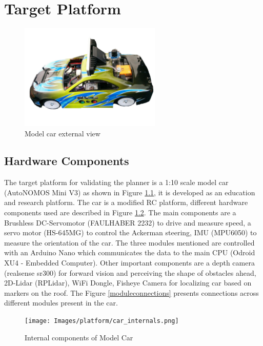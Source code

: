 \chapter{Target Platform}
\label{vehicle_info}

\begin{figure}[H]
	\centering
	\includegraphics[width=0.6\textwidth]{Images/platform/car.jpg}
	\caption{Model car external view}
	\label{model_car}
\end{figure}

\section{Hardware Components}
The target platform for validating the planner is a 1:10 scale model car (AutoNOMOS Mini V3) as shown in Figure \ref{model_car}, it is developed as an education and research platform. The car is a modified RC platform, different hardware components used are described in Figure \ref{internalcar}. The main components are a Brushless DC-Servomotor (FAULHABER 2232) to drive and measure speed, a servo motor (HS-645MG) to control the Ackerman steering, IMU (MPU6050) to measure the orientation of the car. The three modules mentioned are controlled with an Arduino Nano which communicates the data to the main CPU (Odroid XU4 - Embedded Computer). Other important components are a depth camera (realsense sr300) for forward vision and perceiving the shape of obstacles ahead, 2D-Lidar (RPLidar), WiFi Dongle, Fisheye Camera for localizing car based on markers on the roof. The Figure \ref{moduleconnections} presents connections across different modules present in the car.
\begin{figure}
	\centering
	\texttt{[image: Images/platform/car\_internals.png]}
	\caption{Internal components of Model Car}
	\label{internalcar}
\end{figure}

